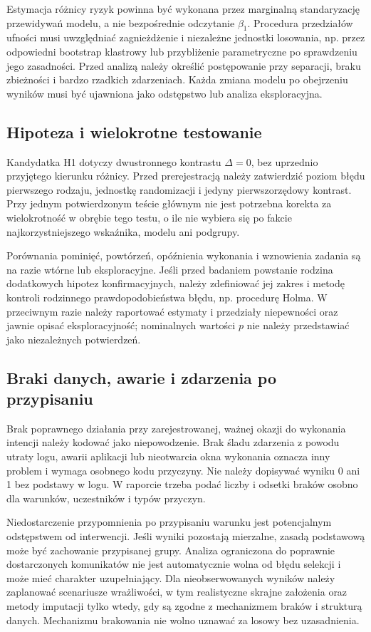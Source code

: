 \documentclass[11pt,a4paper]{article}
\begin{document}
Estymacja różnicy ryzyk powinna być wykonana przez marginalną standaryzację przewidywań modelu, a nie bezpośrednie odczytanie \(\beta_1\). Procedura przedziałów ufności musi uwzględniać zagnieżdżenie i niezależne jednostki losowania, np. przez odpowiedni bootstrap klastrowy lub przybliżenie parametryczne po sprawdzeniu jego zasadności. Przed analizą należy określić postępowanie przy separacji, braku zbieżności i bardzo rzadkich zdarzeniach. Każda zmiana modelu po obejrzeniu wyników musi być ujawniona jako odstępstwo lub analiza eksploracyjna.

\subsection{Hipoteza i wielokrotne testowanie}
Kandydatka H1 dotyczy dwustronnego kontrastu \(\Delta=0\), bez uprzednio przyjętego kierunku różnicy. Przed prerejestracją należy zatwierdzić poziom błędu pierwszego rodzaju, jednostkę randomizacji i jedyny pierwszorzędowy kontrast. Przy jednym potwierdzonym teście głównym nie jest potrzebna korekta za wielokrotność w obrębie tego testu, o ile nie wybiera się po fakcie najkorzystniejszego wskaźnika, modelu ani podgrupy.

Porównania pominięć, powtórzeń, opóźnienia wykonania i wznowienia zadania są na razie wtórne lub eksploracyjne. Jeśli przed badaniem powstanie rodzina dodatkowych hipotez konfirmacyjnych, należy zdefiniować jej zakres i metodę kontroli rodzinnego prawdopodobieństwa błędu, np. procedurę Holma. W przeciwnym razie należy raportować estymaty i przedziały niepewności oraz jawnie opisać eksploracyjność; nominalnych wartości \(p\) nie należy przedstawiać jako niezależnych potwierdzeń.

\subsection{Braki danych, awarie i zdarzenia po przypisaniu}
Brak poprawnego działania przy zarejestrowanej, ważnej okazji do wykonania intencji należy kodować jako niepowodzenie. Brak śladu zdarzenia z powodu utraty logu, awarii aplikacji lub nieotwarcia okna wykonania oznacza inny problem i wymaga osobnego kodu przyczyny. Nie należy dopisywać wyniku 0 ani 1 bez podstawy w logu. W raporcie trzeba podać liczby i odsetki braków osobno dla warunków, uczestników i typów przyczyn.

Niedostarczenie przypomnienia po przypisaniu warunku jest potencjalnym odstępstwem od interwencji. Jeśli wyniki pozostają mierzalne, zasadą podstawową może być zachowanie przypisanej grupy. Analiza ograniczona do poprawnie dostarczonych komunikatów nie jest automatycznie wolna od błędu selekcji i może mieć charakter uzupełniający. Dla nieobserwowanych wyników należy zaplanować scenariusze wrażliwości, w tym realistyczne skrajne założenia oraz metody imputacji tylko wtedy, gdy są zgodne z mechanizmem braków i strukturą danych. Mechanizmu brakowania nie wolno uznawać za losowy bez uzasadnienia.
\end{document}
